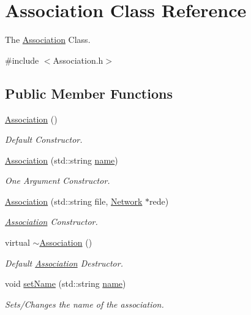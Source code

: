 \hypertarget{classAssociation}{}\section{Association Class Reference}
\label{classAssociation}


The \hyperlink{classAssociation}{Association} Class.  




{\ttfamily \#include $<$Association.\+h$>$}

\subsection*{Public Member Functions}
\begin{DoxyCompactItemize}
\item 
\hyperlink{classAssociation_abf287524f5ab9abf66059e5fa959340b}{Association} ()
\begin{DoxyCompactList}\small\item\em Default Constructor. \end{DoxyCompactList}\item 
\hyperlink{classAssociation_a0773254cf0a1377e144a39b36c99d74d}{Association} (std\+::string \hyperlink{classAssociation_a165477d8d99c99a659d2f193b39ba1f8}{name})
\begin{DoxyCompactList}\small\item\em One Argument Constructor. \end{DoxyCompactList}\item 
\hyperlink{classAssociation_aaf75146fc564138ae2ae2430eb7926a2}{Association} (std\+::string file, \hyperlink{classNetwork}{Network} $\ast$rede)
\begin{DoxyCompactList}\small\item\em \hyperlink{classAssociation}{Association} Constructor. \end{DoxyCompactList}\item 
virtual \hyperlink{classAssociation_adc0ad6a21b904d08c1d392550df9da59}{$\sim$\+Association} ()
\begin{DoxyCompactList}\small\item\em Default \hyperlink{classAssociation}{Association} Destructor. \end{DoxyCompactList}\item 
void \hyperlink{classAssociation_a8bd23fd6c727963237bf85a6374ab6d8}{set\+Name} (std\+::string \hyperlink{classAssociation_a165477d8d99c99a659d2f193b39ba1f8}{name})
\begin{DoxyCompactList}\small\item\em Sets/\+Changes the name of the association. \end{DoxyCompactList}\item 

\end{DoxyCompactItemize}
